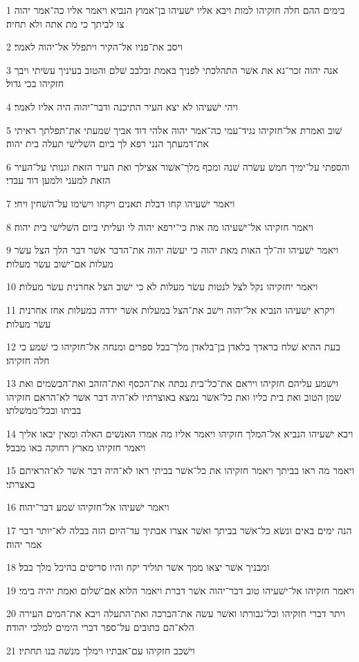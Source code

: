 \par 1 בימים ההם חלה חזקיהו למות ויבא אליו ישׁעיהו בן־אמוץ הנביא ויאמר אליו כה־אמר יהוה צו לביתך כי מת אתה ולא תחיה׃
\par 2 ויסב את־פניו אל־הקיר ויתפלל אל־יהוה לאמר׃
\par 3 אנה יהוה זכר־נא את אשׁר התהלכתי לפניך באמת ובלבב שׁלם והטוב בעיניך עשׂיתי ויבך חזקיהו בכי גדול׃
\par 4 ויהי ישׁעיהו לא יצא העיר התיכנה ודבר־יהוה היה אליו לאמר׃
\par 5 שׁוב ואמרת אל־חזקיהו נגיד־עמי כה־אמר יהוה אלהי דוד אביך שׁמעתי את־תפלתך ראיתי את־דמעתך הנני רפא לך ביום השׁלישׁי תעלה בית יהוה׃
\par 6 והספתי על־ימיך חמשׁ עשׂרה שׁנה ומכף מלך־אשׁור אצילך ואת העיר הזאת וגנותי על־העיר הזאת למעני ולמען דוד עבדי׃
\par 7 ויאמר ישׁעיהו קחו דבלת תאנים ויקחו וישׂימו על־השׁחין ויחי׃
\par 8 ויאמר חזקיהו אל־ישׁעיהו מה אות כי־ירפא יהוה לי ועליתי ביום השׁלישׁי בית יהוה׃
\par 9 ויאמר ישׁעיהו זה־לך האות מאת יהוה כי יעשׂה יהוה את־הדבר אשׁר דבר הלך הצל עשׂר מעלות אם־ישׁוב עשׂר מעלות׃
\par 10 ויאמר יחזקיהו נקל לצל לנטות עשׂר מעלות לא כי ישׁוב הצל אחרנית עשׂר מעלות׃
\par 11 ויקרא ישׁעיהו הנביא אל־יהוה וישׁב את־הצל במעלות אשׁר ירדה במעלות אחז אחרנית עשׂר מעלות׃
\par 12 בעת ההיא שׁלח בראדך בלאדן בן־בלאדן מלך־בבל ספרים ומנחה אל־חזקיהו כי שׁמע כי חלה חזקיהו׃
\par 13 וישׁמע עליהם חזקיהו ויראם את־כל־בית נכתה את־הכסף ואת־הזהב ואת־הבשׂמים ואת שׁמן הטוב ואת בית כליו ואת כל־אשׁר נמצא באוצרתיו לא־היה דבר אשׁר לא־הראם חזקיהו בביתו ובכל־ממשׁלתו׃
\par 14 ויבא ישׁעיהו הנביא אל־המלך חזקיהו ויאמר אליו מה אמרו האנשׁים האלה ומאין יבאו אליך ויאמר חזקיהו מארץ רחוקה באו מבבל׃
\par 15 ויאמר מה ראו בביתך ויאמר חזקיהו את כל־אשׁר בביתי ראו לא־היה דבר אשׁר לא־הראיתם באצרתי׃
\par 16 ויאמר ישׁעיהו אל־חזקיהו שׁמע דבר־יהוה׃
\par 17 הנה ימים באים ונשׂא כל־אשׁר בביתך ואשׁר אצרו אבתיך עד־היום הזה בבלה לא־יותר דבר אמר יהוה׃
\par 18 ומבניך אשׁר יצאו ממך אשׁר תוליד יקח והיו סריסים בהיכל מלך בבל׃
\par 19 ויאמר חזקיהו אל־ישׁעיהו טוב דבר־יהוה אשׁר דברת ויאמר הלוא אם־שׁלום ואמת יהיה בימי׃
\par 20 ויתר דברי חזקיהו וכל־גבורתו ואשׁר עשׂה את־הברכה ואת־התעלה ויבא את־המים העירה הלא־הם כתובים על־ספר דברי הימים למלכי יהודה׃
\par 21 וישׁכב חזקיהו עם־אבתיו וימלך מנשׁה בנו תחתיו׃

